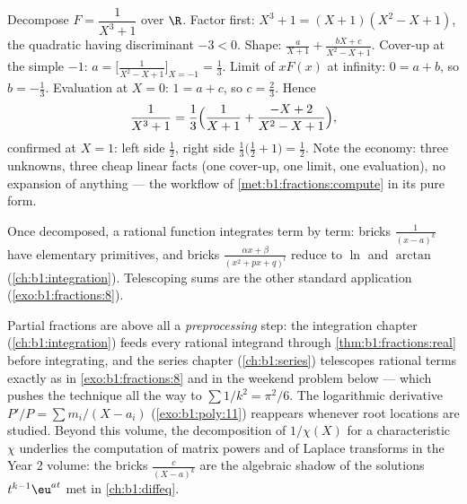 \begin{example}\label{ex:b1:fractions:cubic}
Decompose $F = \dfrac{1}{X^3 + 1}$ over $\R$. Factor first: $X^3 +
1 = (X + 1)(X^2 - X + 1)$, the quadratic having discriminant $-3 <
0$. Shape: $\frac{a}{X+1} + \frac{bX + c}{X^2 - X + 1}$. Cover-up
at the simple  $-1$: $a = \bigl[\frac1{X^2 - X +
1}\bigr]_{X=-1} = \frac13$. Limit of $xF(x)$ at infinity: $0 = a +
b$, so $b = -\frac13$. Evaluation at $X = 0$: $1 = a + c$, so $c =
\frac23$. Hence
\[
\frac{1}{X^3+1} = \frac13\Bigl(\frac{1}{X+1}
+ \frac{-X + 2}{X^2 - X + 1}\Bigr) ,
\]
confirmed at $X = 1$: left side $\frac12$, right side
$\frac13\bigl(\frac12 + 1\bigr) = \frac12$. Note the economy:
three unknowns, three cheap linear facts (one cover-up, one
limit, one evaluation), no expansion of anything --- the workflow
of \cref{met:b1:fractions:compute} in its pure form.
\end{example}

\begin{remark}
Once decomposed, a rational function integrates term by term: bricks
$\frac{1}{(x-a)^k}$ have elementary primitives, and bricks
$\frac{\alpha x + \beta}{(x^2 + px + q)^l}$ reduce to $\ln$ and
$\arctan$ (\cref{ch:b1:integration}). Telescoping sums are the other
standard application (\cref{exo:b1:fractions:8}).
\end{remark}

\begin{remark}\label{rem:b1:fractions:whereused}
Partial fractions are above all a \emph{preprocessing} step: the
integration chapter (\cref{ch:b1:integration}) feeds every rational
integrand through \cref{thm:b1:fractions:real} before integrating,
and the series chapter (\cref{ch:b1:series}) telescopes rational
terms exactly as in \cref{exo:b1:fractions:8} and in the weekend
problem below --- which pushes the technique all the way to
$\sum 1/k^2 = \pi^2/6$. The logarithmic derivative $P'/P = \sum
m_i/(X - a_i)$ (\cref{exo:b1:poly:11}) reappears whenever root
locations are studied. Beyond this volume, the decomposition of
$1/\chi(X)$ for a characteristic  $\chi$ underlies the
computation of matrix powers and of Laplace transforms in the Year
2 volume: the bricks $\frac{c}{(X - a)^k}$ are the algebraic shadow
of the solutions $t^{k-1}\eu^{at}$ met in \cref{ch:b1:diffeq}.
\end{remark}

